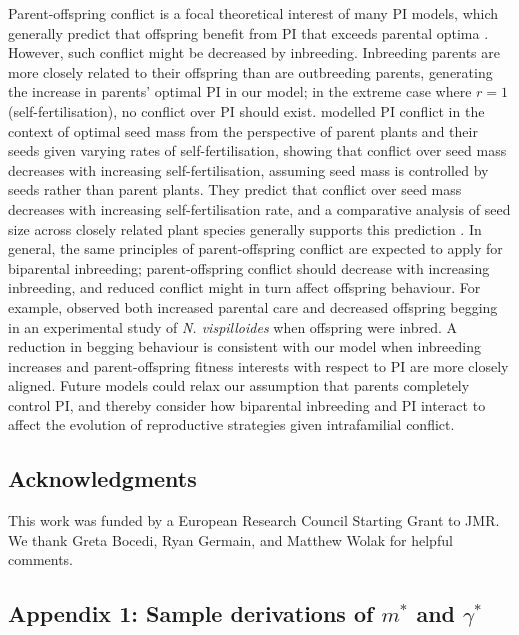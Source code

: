 \documentclass[10pt,letterpaper]{article}
\begin{document}
Parent-offspring conflict is a focal theoretical interest of many PI models, which generally predict that offspring benefit from PI that exceeds parental optima \cite[e.g.,][]{Macnair1978, Parker1978, Parker1985, DeJong2005}. However, such conflict might be decreased by inbreeding. Inbreeding parents are more closely related to their offspring than are outbreeding parents, generating the increase in parents' optimal PI in our model; in the extreme case where $r=1$ (self-fertilisation), no conflict over PI should exist. \cite{DeJong2005} modelled PI conflict in the context of optimal seed mass from the perspective of parent plants and their seeds given varying rates of self-fertilisation, showing that conflict over seed mass decreases with increasing self-fertilisation, assuming seed mass is controlled by seeds rather than parent plants. They predict that conflict over seed mass decreases with increasing self-fertilisation rate, and a comparative analysis of seed size across closely related plant species generally supports this prediction \cite[][]{DeJong2005}. In general, the same principles of parent-offspring conflict are expected to apply for biparental inbreeding; parent-offspring conflict should decrease with increasing inbreeding, and reduced conflict might in turn affect offspring behaviour. For example, \cite{Mattey2014} observed both increased parental care and decreased offspring begging in an experimental study of \textit{N. vispilloides} when offspring were inbred. A reduction in begging behaviour is consistent with our model when inbreeding increases and parent-offspring fitness interests with respect to PI are more closely aligned. Future models could relax our assumption that parents completely control PI, and thereby consider how biparental inbreeding and PI interact to affect the evolution of reproductive strategies given intrafamilial conflict.

\subsection*{Acknowledgments}

This work was funded by a European Research Council Starting Grant to JMR. We thank Greta Bocedi, Ryan Germain, and Matthew Wolak for helpful comments.

\subsection*{Appendix 1: Sample derivations of $m^{*}$ and $\gamma^{*}$}
\end{document}
